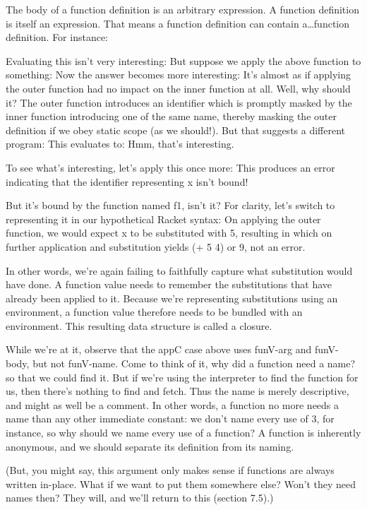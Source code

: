 
The body of a function definition is an arbitrary expression. A function
definition is itself an expression. That means a function definition can contain
a\ldots function definition. For instance:

Evaluating this isn’t very interesting:
But suppose we apply the above function to something:
Now the answer becomes more interesting:
It’s almost as if applying the outer function had no impact on the inner
function at all. Well, why should it? The outer function introduces an
identifier which is promptly masked by the inner function introducing one of the
same name, thereby masking the outer definition if we obey static scope (as we
should!). But that suggests a different program:
This evaluates to:
Hmm, that’s interesting.

To see what’s interesting, let’s apply this once more:
This produces an error indicating that the identifier representing x isn’t
bound!

But it’s bound by the function named f1, isn’t it? For clarity, let’s switch to
representing it in our hypothetical Racket syntax:
On applying the outer function, we would expect x to be substituted with 5, resulting
in
which on further application and substitution yields (+ 5 4) or 9, not an error.

In other words, we’re again failing to faithfully capture what substitution
would have done. A function value needs to remember the substitutions that have
already been applied to it. Because we’re representing substitutions using an
environment, a function value therefore needs to be bundled with an environment.
This resulting data structure is called a closure.

While we’re at it, observe that the appC case above uses funV-arg and funV-
body, but not funV-name. Come to think of it, why did a function need a name? so
that we could find it. But if we’re using the interpreter to find the function for us, then
there’s nothing to find and fetch. Thus the name is merely descriptive, and might as
well be a comment. In other words, a function no more needs a name than any other
immediate constant: we don’t name every use of 3, for instance, so why should we
name every use of a function? A function is inherently anonymous, and we should
separate its definition from its naming.

(But, you might say, this argument only makes sense if functions are always written
in-place. What if we want to put them somewhere else? Won’t they need names then?
They will, and we’ll return to this (section 7.5).)

